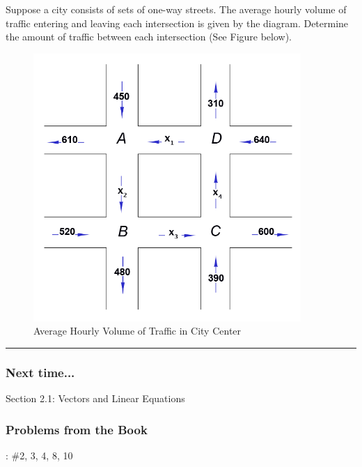 \begin{questions}
\question   Suppose a city consists of sets of one-way streets.  The average hourly volume of traffic entering and leaving each intersection is given by the diagram.  Determine the amount of traffic between each intersection (See Figure below).
        \begin{figure}[htbp] %
           \centering
           \includegraphics[width=4in]{figures/trafficflow.png} 
           \caption{Average Hourly Volume of Traffic in City Center}
           \label{fig:trafficflow}
        \end{figure}
        
   		


\end{questions}




\rule[0.01in]{\textwidth}{0.0025in}


\subsubsection*{Next time...}
Section 2.1: Vectors and Linear Equations





\subsubsection*{Problems from the Book}
: \#2, 3, 4, 8, 10












